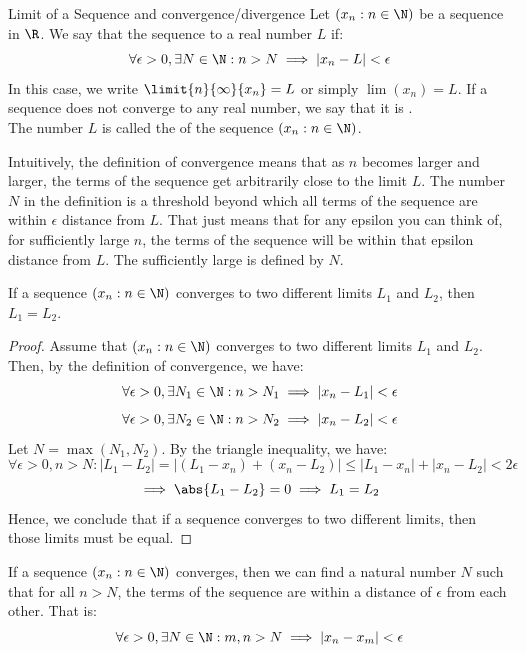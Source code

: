 \documentclass[openany]{book}
\begin{document}
\begin{mydefinition}{Limit of a Sequence and convergence/divergence}
    Let $(x_n : n \in \N)$ be a sequence in $\R$. We say that the sequence  to a real number $L$ if:
    $$\forall \epsilon > 0, \exists N \in \N: n > N \implies |x_n - L| < \epsilon$$
    In this case, we write $\limit{n}{\infty}{x_n} = L$ or simply $\lim(x_n) = L$. If a sequence does not converge to any real number, we say that it is . \\
    The number $L$ is called the  of the sequence $(x_n : n \in \N)$.
\end{mydefinition}
\begin{mynote}
    Intuitively, the definition of convergence means that as $n$ becomes larger and larger, the terms of the sequence get arbitrarily close to the limit $L$. The number $N$ in the definition is a threshold beyond which all terms of the sequence are within $\epsilon$ distance from $L$. That just means that for any epsilon you can think of, for sufficiently large $n$, the terms of the sequence will be within that epsilon distance from $L$. The sufficiently large is defined by $N$.
\end{mynote}
\begin{mytheorem}
    If a sequence $(x_n : n \in \N)$ converges to two different limits $L_1$ and $L_2$, then $L_1 = L_2$.
\end{mytheorem}
\begin{proof}
    Assume that $(x_n : n \in \N)$ converges to two different limits $L_1$ and $L_2$. Then, by the definition of convergence, we have:
    $$\forall \epsilon > 0, \exists N_1 \in \N: n > N_1 \implies |x_n - L_1| < \epsilon$$
    $$\forall \epsilon > 0, \exists N_2 \in \N: n > N_2 \implies |x_n - L_2| < \epsilon$$
    Let $N = \max(N_1, N_2)$.
    By the triangle inequality, we have:
    $$\forall \epsilon > 0, n>N: |L_1 - L_2| = |(L_1 - x_n) + (x_n - L_2)| \leq |L_1 - x_n| + |x_n - L_2| < 2\epsilon$$ 
    $$\implies \abs{L_1 -L_2} = 0 \implies L_1 = L_2$$
    Hence, we conclude that if a sequence converges to two different limits, then those limits must be equal.
\end{proof}
\begin{mytheorem}
    If a sequence $(x_n : n \in \N)$ converges, then we can find a natural number $N$ such that for all $n > N$, the terms of the sequence are within a distance of $\epsilon$ from each other. That is:
    $$\forall \epsilon > 0, \exists N \in \N: m, n > N \implies |x_n - x_m| < \epsilon$$
\end{mytheorem}
\end{document}
